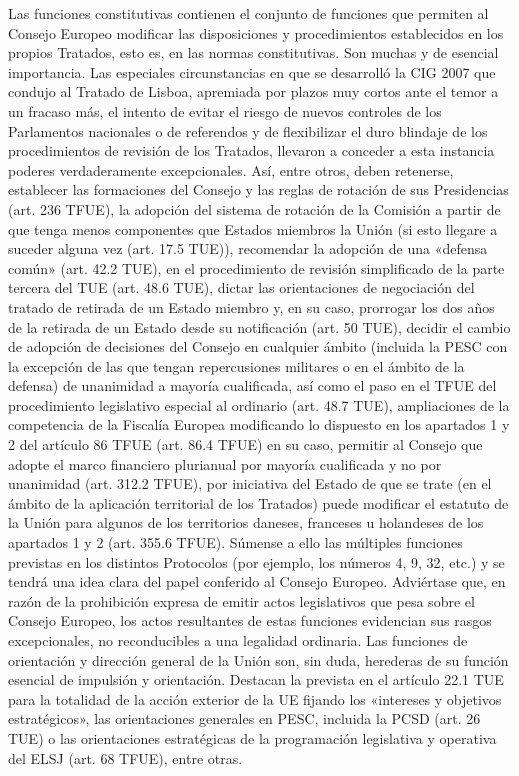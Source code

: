 \documentclass[10pt,a4paper]{article}
\begin{document}
Las funciones constitutivas contienen el conjunto de funciones que permiten al Consejo Europeo modificar las disposiciones y procedimientos establecidos en los propios Tratados, esto es, en las normas constitutivas. Son muchas y de esencial importancia. Las especiales circunstancias en que se desarrolló la CIG 2007 que condujo al Tratado de Lisboa, apremiada por plazos muy cortos ante el temor a un fracaso más, el intento de evitar el riesgo de nuevos controles de los Parlamentos nacionales o de referendos y de flexibilizar el duro blindaje de los procedimientos de revisión de los Tratados, llevaron a conceder a esta instancia poderes verdaderamente excepcionales. Así, entre otros, deben retenerse, establecer las formaciones del Consejo y las reglas de rotación de sus Presidencias (art. 236 TFUE), la adopción del sistema de rotación de la Comisión a partir de que tenga menos componentes que Estados miembros la Unión (si esto llegare a suceder alguna vez (art. 17.5 TUE)), recomendar la adopción de una «defensa común» (art. 42.2 TUE), en el procedimiento de revisión simplificado de la parte tercera del TUE (art. 48.6 TUE), dictar las orientaciones de negociación del tratado de retirada de un Estado miembro y, en su caso, prorrogar los dos años de la retirada de un Estado desde su notificación (art. 50 TUE), decidir el cambio de adopción de decisiones del Consejo en cualquier ámbito (incluida la PESC con la excepción de las que tengan repercusiones militares o en el ámbito de la defensa) de unanimidad a mayoría cualificada, así como el paso en el TFUE del procedimiento legislativo especial al ordinario (art. 48.7 TUE), ampliaciones de la competencia de la Fiscalía Europea modificando lo dispuesto en los apartados 1 y 2 del artículo 86 TFUE (art. 86.4 TFUE) en su caso, permitir al Consejo que adopte el marco financiero plurianual por mayoría cualificada y no por unanimidad (art. 312.2 TFUE), por iniciativa del Estado de que se trate (en el ámbito de la aplicación territorial de los Tratados) puede modificar el estatuto de la Unión para algunos de los territorios daneses, franceses u holandeses de los apartados 1 y 2 (art. 355.6 TFUE). Súmense a ello las múltiples funciones previstas en los distintos Protocolos (por ejemplo, los números 4, 9, 32, etc.) y se tendrá una idea clara del papel conferido al Consejo Europeo. Adviértase que, en razón de la prohibición expresa de emitir actos legislativos que pesa sobre el Consejo Europeo, los actos resultantes de estas funciones evidencian sus rasgos excepcionales, no reconducibles a una legalidad ordinaria. Las funciones de orientación y dirección general de la Unión son, sin duda, herederas de su función esencial de impulsión y orientación. Destacan la prevista en el artículo 22.1 TUE para la totalidad de la acción exterior de la UE fijando los «intereses y objetivos estratégicos», las orientaciones generales en PESC, incluida la PCSD (art. 26 TUE) o las orientaciones estratégicas de la programación legislativa y operativa del ELSJ (art. 68 TFUE), entre otras.
\end{document}
